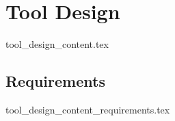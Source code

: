 \chapter{Tool Design}\label{sec:tool_design}
  {tool_design_content.tex}

\section{Requirements}
  {tool_design_content_requirements.tex}
